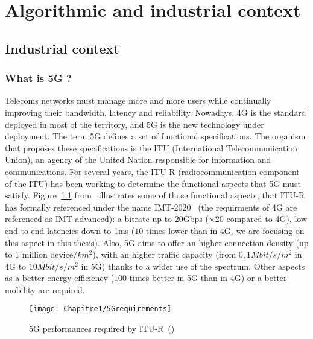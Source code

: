 
\chapter{Algorithmic and industrial context}
\label{chap:context}
\minitoc

\section{Industrial context}
\subsection{What is 5G ?}



Telecoms networks must manage more and more users while continually improving their bandwidth, latency and reliability. Nowadays, 4G is the standard deployed in most of the territory, and 5G is the new technology under deployment. The term 5G defines a set of functional specifications. The organism that proposes these specifications is the ITU (International Telecommunication Union), an agency of the United Nation responsible for information and communications. For several years, the ITU-R (radiocommunication component of the ITU) has been working to determine the functional aspects that 5G must satisfy. Figure~\ref{fig:5gperf} from~\cite{dahlman20185g} illustrates some of those functional aspects, that ITU-R has formally referenced under the name IMT-2020~\cite{romano2019imt} (the requirments of 4G are referenced as IMT-advanced): a bitrate up to 20Gbps ($\times 20$ compared to 4G), low end to end latencies down to 1ms ($10$ times lower than in 4G, we are focusing on this aspect in this thesis).
Also, 5G aims to offer an higher connection density (up to 1 million device$/km^2$), with an higher traffic capacity (from $0,1 Mbit/s/m^2$ in 4G to $10 Mbit/s/m^2$ in 5G) thanks to a wider use of the spectrum. Other aspects as a better energy efficiency ($100$ times better in 5G than in 4G) or a better mobility are required. 

  \begin{figure}[h]
      \begin{center}
      \texttt{[image: Chapitre1/5Grequirements]}
      \end{center}
      \caption{5G performances required by ITU-R~(\cite{dahlman20185g})}\label{fig:5gperf}
      \end{figure}

